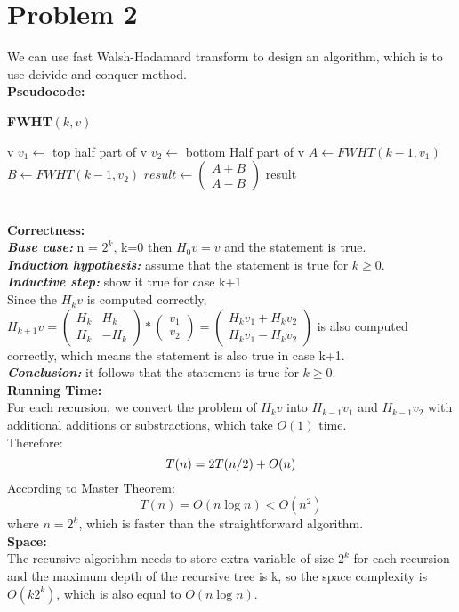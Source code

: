 \documentclass[twoside]{homework}
\begin{document}
\section*{Problem 2}
We can use fast Walsh-Hadamard transform to design an algorithm, which is to use deivide and conquer method.
\\\textbf{Pseudocode:} \quad
\begin{algorithm}
	\caption*{\textbf{FWHT$(k,v)$}}
	\begin{algorithmic}
		\RETURN v
		\ENDIF
		\STATE $v_1 \leftarrow$ top half part of v
		\STATE $v_2 \leftarrow$ bottom Half part of v
		\STATE $A \leftarrow FWHT(k-1,v_1)$
		\STATE $B \leftarrow FWHT(k-1,v_2)$
		\STATE $result \leftarrow \begin{pmatrix}
		A+B\\
		A-B
		\end{pmatrix}$
		\RETURN result
	\end{algorithmic}		
\end{algorithm}
\\\textbf{Correctness:} \quad
\\\textbf{\emph{Base case:}}  n = $2^k$, k=0 then $H_0 v = v$ and the statement is true.
\\\textbf{\emph{Induction hypothesis:}} assume that the statement is true for $k\ge 0$.
\\\textbf{\emph{Inductive step:}} show it true for case k+1
\\Since the $H_k v$ is computed correctly, $H_{k+1} v = \begin{pmatrix}
H_{k} & H_{k}\\
H_{k} & -H_{k} 
\end{pmatrix}
*\begin{pmatrix}
v_{1}\\
v_{2}
\end{pmatrix}=\begin{pmatrix}
H_{k}v_{1}+H_{k}v_{2}\\
H_{k}v_{1}-H_{k}v_{2}
\end{pmatrix}$
is also computed correctly, which means the statement is also true in case k+1.
\\\textbf{\emph{Conclusion:}} 
it follows that the statement is true for $k\ge 0$.
\\\textbf{Running Time:} \quad
\\For each recursion, we convert the problem of $H_{k}v$ into $H_{k-1}v_{1}$ and $H_{k-1}v_{2}$ with additional additions or substractions, which take $O(1)$ time.\\
Therefore:
$$T(n)=2T(n/2)+O(n)\\$$
According to Master Theorem:
$$T(n)=O(n\log n)<O(n^2)$$
where $n=2^k$, which is faster than the straightforward algorithm.
\\\textbf{Space:} \quad
\\The recursive algorithm needs to store extra variable of size $2^k$ for each recursion and the maximum depth of the recursive tree is k, so the space complexity is $O(k2^k)$, which is also equal to $O(n\log n)$. 
\end{document}
